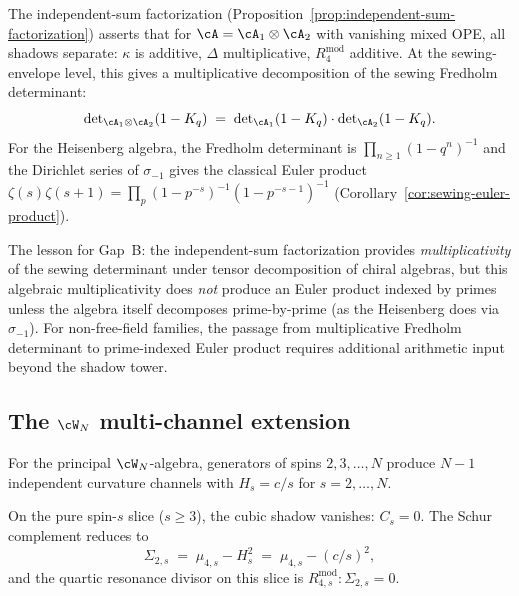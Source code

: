 \begin{remark}
\label{rem:euler-product-from-independent-sum}
The independent-sum factorization
(Proposition~\ref{prop:independent-sum-factorization}) asserts
that for $\cA = \cA_1 \otimes \cA_2$ with vanishing mixed OPE,
all shadows separate: $\kappa$ is additive,
$\Delta$ multiplicative,
$R_4^{\mathrm{mod}}$ additive. At the sewing-envelope level,
this gives a multiplicative decomposition of the sewing
Fredholm determinant:
\[
\det\nolimits_{\cA_1\otimes\cA_2}(1 - K_q)
\;=\;
\det\nolimits_{\cA_1}(1 - K_q)
\cdot
\det\nolimits_{\cA_2}(1 - K_q).
\]
For the Heisenberg algebra, the Fredholm determinant is
$\prod_{n \geq 1}(1 - q^n)^{-1}$
and the Dirichlet series of $\sigma_{-1}$ gives the classical
Euler product
$\zeta(s)\zeta(s{+}1) = \prod_p
(1{-}p^{-s})^{-1}(1{-}p^{-s-1})^{-1}$
(Corollary~\ref{cor:sewing-euler-product}).

The lesson for Gap~B: the independent-sum
factorization provides \emph{multiplicativity} of the sewing
determinant under tensor decomposition of chiral algebras,
but this algebraic multiplicativity does \emph{not}
produce an Euler product indexed by primes unless the
algebra itself decomposes prime-by-prime (as the Heisenberg
does via $\sigma_{-1}$). For non-free-field families, the
passage from multiplicative Fredholm determinant to
prime-indexed Euler product requires additional arithmetic
input beyond the shadow tower.
\end{remark}

\subsection{The $\cW_N$ multi-channel extension}%
\label{sec:wn-multichannel}

For the principal $\cW_N$-algebra, generators of spins
$2, 3, \ldots, N$ produce $N{-}1$ independent curvature
channels with $H_s = c/s$ for $s = 2,\ldots,N$.

\begin{proposition}[\ClaimStatusProvedHere]%
\label{prop:pure-spin-s-schur}%
%
On the pure spin-$s$ slice \textup{(}$s \geq 3$\textup{)},
the cubic shadow vanishes: $C_s = 0$. The Schur
complement reduces to
\begin{equation}\label{eq:pure-spin-s-schur}
\Sigma_{2,s}
\;=\;
\mu_{4,s} - H_s^2
\;=\;
\mu_{4,s} - (c/s)^2,
\end{equation}
and the quartic resonance divisor on this slice is
$R_{4,s}^{\mathrm{mod}}\colon\Sigma_{2,s} = 0$.
\end{proposition}

